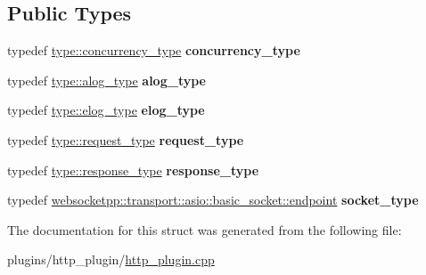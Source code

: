 \subsection*{Public Types}
\begin{DoxyCompactItemize}
\item 
\mbox{\label{structaacio_1_1detail_1_1asio__with__stub__log_1_1transport__config_a1dac1009bcc4b17680dfcb3178817311}} 
typedef \mbox{\hyperlink{classwebsocketpp_1_1concurrency_1_1basic}{type\+::concurrency\+\_\+type}} {\bfseries concurrency\+\_\+type}
\item 
\mbox{\label{structaacio_1_1detail_1_1asio__with__stub__log_1_1transport__config_aed79ec9bb71147919657fb50d15991c6}} 
typedef \mbox{\hyperlink{classwebsocketpp_1_1log_1_1basic}{type\+::alog\+\_\+type}} {\bfseries alog\+\_\+type}
\item 
\mbox{\label{structaacio_1_1detail_1_1asio__with__stub__log_1_1transport__config_a5ffea9784cf9e5f3f250bf215588863c}} 
typedef \mbox{\hyperlink{classwebsocketpp_1_1log_1_1basic}{type\+::elog\+\_\+type}} {\bfseries elog\+\_\+type}
\item 
\mbox{\label{structaacio_1_1detail_1_1asio__with__stub__log_1_1transport__config_a8d16bb19d5d9a77e8450878ccda80230}} 
typedef \mbox{\hyperlink{classwebsocketpp_1_1http_1_1parser_1_1request}{type\+::request\+\_\+type}} {\bfseries request\+\_\+type}
\item 
\mbox{\label{structaacio_1_1detail_1_1asio__with__stub__log_1_1transport__config_a3698031941e1e4ba19e6921a432b8313}} 
typedef \mbox{\hyperlink{classwebsocketpp_1_1http_1_1parser_1_1response}{type\+::response\+\_\+type}} {\bfseries response\+\_\+type}
\item 
\mbox{\label{structaacio_1_1detail_1_1asio__with__stub__log_1_1transport__config_a7cc1c1ccd259e5791aec5133ef12af9c}} 
typedef \mbox{\hyperlink{classwebsocketpp_1_1transport_1_1asio_1_1basic__socket_1_1endpoint}{websocketpp\+::transport\+::asio\+::basic\+\_\+socket\+::endpoint}} {\bfseries socket\+\_\+type}
\end{DoxyCompactItemize}


The documentation for this struct was generated from the following file\+:\begin{DoxyCompactItemize}
\item 
plugins/http\+\_\+plugin/\mbox{\hyperlink{http__plugin_8cpp}{http\+\_\+plugin.\+cpp}}\end{DoxyCompactItemize}
